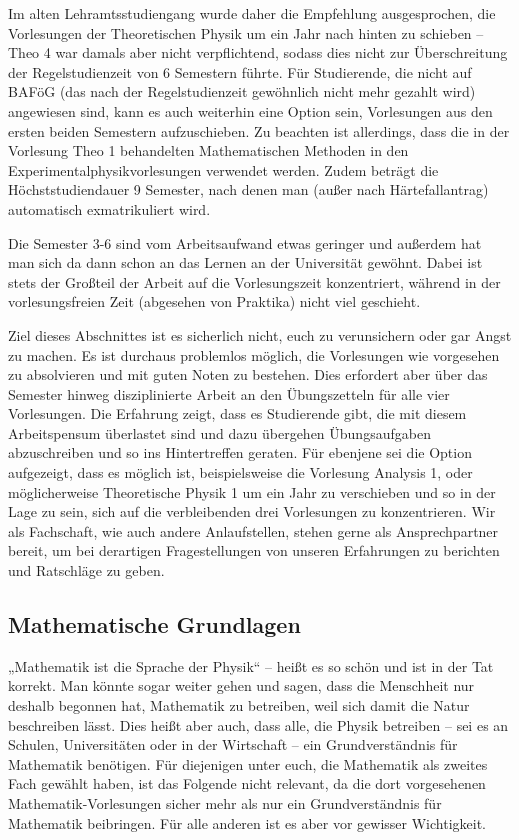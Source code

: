 Im alten Lehramtsstudiengang wurde daher die Empfehlung ausgesprochen, die
Vorlesungen der Theoretischen Physik um ein Jahr nach hinten zu schieben --
Theo 4 war damals aber nicht verpflichtend, sodass dies nicht zur
Überschreitung der Regelstudienzeit von 6 Semestern führte. Für Studierende,
die nicht auf BAFöG (das nach der Regelstudienzeit gewöhnlich nicht mehr
gezahlt wird) angewiesen sind, kann es auch weiterhin eine Option sein,
Vorlesungen aus den ersten beiden Semestern aufzuschieben. Zu beachten ist
allerdings, dass die in der Vorlesung Theo 1 behandelten Mathematischen
Methoden in den Experimentalphysikvorlesungen verwendet werden. Zudem
beträgt die Höchststudiendauer 9 Semester, nach denen man (außer nach
Härtefallantrag) automatisch exmatrikuliert wird.

Die Semester 3-6 sind vom Arbeitsaufwand etwas geringer und außerdem hat man
sich da dann schon an das Lernen an der Universität gewöhnt. Dabei ist stets
der Großteil der Arbeit auf die Vorlesungszeit konzentriert, während in der
vorlesungsfreien Zeit (abgesehen von Praktika) nicht viel geschieht.

Ziel dieses Abschnittes ist es sicherlich nicht, euch zu verunsichern oder
gar Angst zu machen. Es ist durchaus problemlos möglich, die Vorlesungen wie
vorgesehen zu absolvieren und mit guten Noten zu bestehen. Dies erfordert
aber über das Semester hinweg disziplinierte Arbeit an den Übungszetteln für
alle vier Vorlesungen. Die Erfahrung zeigt, dass es Studierende gibt, die
mit diesem Arbeitspensum überlastet sind und dazu übergehen Übungsaufgaben
abzuschreiben und so ins Hintertreffen geraten. Für ebenjene sei die Option
aufgezeigt, dass es möglich ist, beispielsweise die Vorlesung Analysis 1,
oder möglicherweise Theoretische Physik 1 um ein Jahr zu verschieben und so
in der Lage zu sein, sich auf die verbleibenden drei Vorlesungen zu
konzentrieren. Wir als Fachschaft, wie auch andere Anlaufstellen, stehen
gerne als Ansprechpartner bereit, um bei derartigen Fragestellungen von
unseren Erfahrungen zu berichten und Ratschläge zu geben.


\subsection{Mathematische Grundlagen}

„Mathematik ist die Sprache der Physik“ -- heißt es so schön und ist in der
Tat korrekt. Man könnte sogar weiter gehen und sagen, dass die Menschheit
nur deshalb begonnen hat, Mathematik zu betreiben, weil sich damit die Natur
beschreiben lässt. Dies heißt aber auch, dass alle, die Physik betreiben --
sei es an Schulen, Universitäten oder in der Wirtschaft -- ein
Grundverständnis für Mathematik benötigen. Für diejenigen unter euch, die
Mathematik als zweites Fach gewählt haben, ist das Folgende nicht relevant,
da die dort vorgesehenen Mathematik-Vorlesungen sicher mehr als nur ein
Grundverständnis für Mathematik beibringen. Für alle anderen ist es aber vor
gewisser Wichtigkeit.

